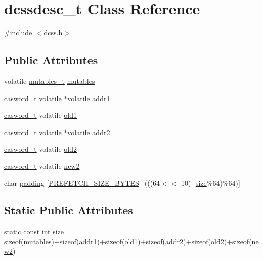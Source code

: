 \hypertarget{classdcssdesc__t}{}\section{dcssdesc\+\_\+t Class Reference}
\label{classdcssdesc__t}


{\ttfamily \#include $<$dcss.\+h$>$}

\subsection*{Public Attributes}
\begin{DoxyCompactItemize}
\item 
volatile \hyperlink{descriptors_8h_a8a5af2749482b19d7515054489efca22}{mutables\+\_\+t} \hyperlink{classdcssdesc__t_af1008652cb54a2fa90eb657d61c0038a}{mutables}
\item 
\hyperlink{rq__unsafe_8h_ad45142aaf2ff20a036dc6242b8483e9c}{casword\+\_\+t} volatile $\ast$volatile \hyperlink{classdcssdesc__t_a61326e9aa1b6b4d49461340997dcb636}{addr1}
\item 
\hyperlink{rq__unsafe_8h_ad45142aaf2ff20a036dc6242b8483e9c}{casword\+\_\+t} volatile \hyperlink{classdcssdesc__t_aafaef5d8bba1a492dfe0268b381709c3}{old1}
\item 
\hyperlink{rq__unsafe_8h_ad45142aaf2ff20a036dc6242b8483e9c}{casword\+\_\+t} volatile $\ast$volatile \hyperlink{classdcssdesc__t_a582de2e5799592e124400d256c85b281}{addr2}
\item 
\hyperlink{rq__unsafe_8h_ad45142aaf2ff20a036dc6242b8483e9c}{casword\+\_\+t} volatile \hyperlink{classdcssdesc__t_a059d5c222ad94e927c840f01b7850952}{old2}
\item 
\hyperlink{rq__unsafe_8h_ad45142aaf2ff20a036dc6242b8483e9c}{casword\+\_\+t} volatile \hyperlink{classdcssdesc__t_aa8e70f20c6b69b7a9a604fa15c4de10c}{new2}
\item 
char \hyperlink{classdcssdesc__t_acf8b5fd8e88fc6bf7d21b6c7daf3fcf3}{padding} \mbox{[}\hyperlink{plaf_8h_a9492d3f4847aa8514510373df7ad0e73}{P\+R\+E\+F\+E\+T\+C\+H\+\_\+\+S\+I\+Z\+E\+\_\+\+B\+Y\+T\+ES}+(((64$<$$<$ 10) -\/\hyperlink{classdcssdesc__t_a7807beda79b554a70aacdf089dfe6b73}{size}\%64)\%64)\mbox{]}
\end{DoxyCompactItemize}
\subsection*{Static Public Attributes}
\begin{DoxyCompactItemize}
\item 
static const int \hyperlink{classdcssdesc__t_a7807beda79b554a70aacdf089dfe6b73}{size} = sizeof(\hyperlink{classdcssdesc__t_af1008652cb54a2fa90eb657d61c0038a}{mutables})+sizeof(\hyperlink{classdcssdesc__t_a61326e9aa1b6b4d49461340997dcb636}{addr1})+sizeof(\hyperlink{classdcssdesc__t_aafaef5d8bba1a492dfe0268b381709c3}{old1})+sizeof(\hyperlink{classdcssdesc__t_a582de2e5799592e124400d256c85b281}{addr2})+sizeof(\hyperlink{classdcssdesc__t_a059d5c222ad94e927c840f01b7850952}{old2})+sizeof(\hyperlink{classdcssdesc__t_aa8e70f20c6b69b7a9a604fa15c4de10c}{new2})
\end{DoxyCompactItemize}


